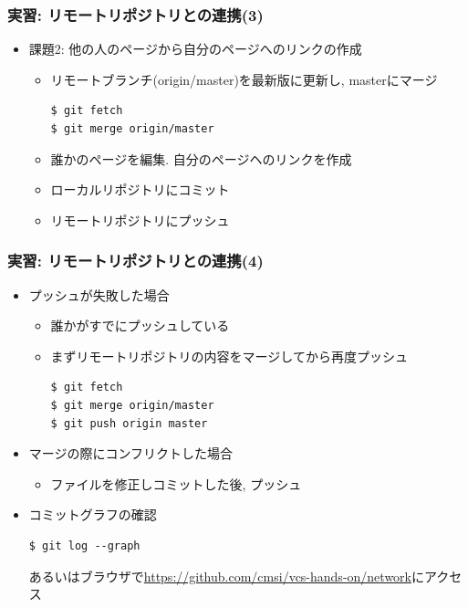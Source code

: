 \begin{frame}[t,fragile]
  \frametitle{実習: リモートリポジトリとの連携(3)}
  \begin{itemize}
  \item 課題2: 他の人のページから自分のページへのリンクの作成
    \begin{itemize}
      \item リモートブランチ(origin/master)を最新版に更新し, masterにマージ
\begin{lstlisting}
$ git fetch
$ git merge origin/master
\end{lstlisting}
      \item 誰かのページを編集. 自分のページヘのリンクを作成
      \item ローカルリポジトリにコミット
      \item リモートリポジトリにプッシュ
    \end{itemize}
  \end{itemize}
\end{frame}

\begin{frame}[t,fragile]
  \frametitle{実習: リモートリポジトリとの連携(4)}
  \begin{itemize}
  \item プッシュが失敗した場合
    \begin{itemize}
      \item 誰かがすでにプッシュしている
      \item まずリモートリポジトリの内容をマージしてから再度プッシュ
\begin{lstlisting}
$ git fetch
$ git merge origin/master
$ git push origin master
\end{lstlisting}
    \end{itemize}
  \item マージの際にコンフリクトした場合
    \begin{itemize}
      \item ファイルを修正しコミットした後, プッシュ
    \end{itemize}
  \item コミットグラフの確認
\begin{lstlisting}
$ git log --graph
\end{lstlisting}
    あるいはブラウザで\url{https://github.com/cmsi/vcs-hands-on/network}にアクセス
  \end{itemize}
\end{frame}

